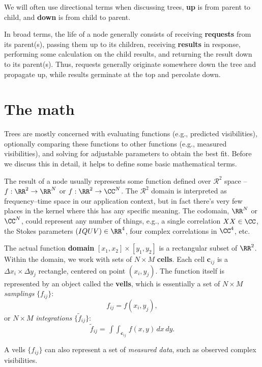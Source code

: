   We will often use directional terms when discussing trees, {\bf up} is from
  parent to child, and {\bf down} is from child to parent.

  In broad terms, the life of a node generally consists of receiving {\bf
  requests} from its parent(s), passing them up to its children, receiving {\bf
  results} in response, performing some calculation on the child results, and
  returning the result down to its parent(s). Thus, requests generally originate
  somewhere down the tree and propagate up, while results germinate at the top
  and percolate down. 

\section{The math}
  \label{sec:math}

  Trees are mostly concerned with evaluating functions (e.g., predicted
  visibilities), optionally comparing these functions to other functions (e.g.,
  measured visibilities), and solving for adjustable parameters to obtain the
  best fit. Before we discuss this in detail, it helps to define some basic 
  mathematical terms.

  The result of a node usually represents some function defined over
  $\mathcal{R}^2$ space -- $f:\RR^2\rightarrow\RR^N$ or
  $f:\RR^2\rightarrow\CC^N$. The $\mathcal{R}^2$ domain is interpreted as
  frequency--time space in our application context, but in fact there's very
  few places in the kernel where this has any specific meaning. The codomain,
  $\RR^N$ or $\CC^N$, could represent any number of things, e.g., a single
  correlation $XX\in\CC$, the Stokes parameters $(IQUV)\in\RR^4$, four complex
  correlations in $\CC^4$, etc.

  The actual function {\bf domain} $[x_1,x_2]\times[y_1,y_2]$  is a rectangular
  subset of $\RR^2$. Within the domain, we work with sets of $N\times M$ {\bf
  cells}. Each cell ${\mathbf c}_{ij}$ is a $\Delta x_i\times\Delta y_j$
  rectangle, centered on point $(x_i,y_j)$. The function itself is represented
  by an object called the {\bf vells}, which is essentially a set of $N\times
  M$ {\em samplings}\/ $\{f_{ij}\}$:  $$f_{ij}=f(x_i,y_j),$$ or $N\times M$
  {\em integrations}\/ $\{\tilde{f}_{ij}\}$: $$
  \tilde{f}_{ij}=\mathop{\int\!\!\!\int}_{{\mathbf c}_{ij}}f(x,y)\,dx\,dy.$$
  
  A vells $\{f_{ij}\}$ can also represent a set of {\em measured data}, such as
  observed complex visibilities. 
  
